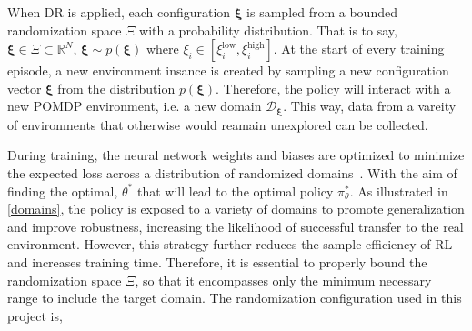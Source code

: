 \noindent When \ac{DR} is applied, each configuration $\boldsymbol{\xi}$ is sampled from a bounded randomization space $\Xi$ with a probability distribution. 
That is to say, $\boldsymbol{\xi} \in \Xi \subset \mathbb{R}^N$,  $\boldsymbol{\xi} \sim p(\boldsymbol{\xi})$ where $\xi_i \in [\xi_i^{\text{low}}, \xi_i^{\text{high}}]$. 
At the start of every training episode, a new environment insance is created by sampling a new configuration vector $\boldsymbol{\xi}$ from the distribution $p(\boldsymbol{\xi})$. 
Therefore, the policy will interact with a new \ac{POMDP} environment, i.e. a new domain $\mathcal{D}_{\boldsymbol{\xi}}$. 
This way, data from a vareity of environments that otherwise would reamain unexplored can be collected. 

During training, the neural network weights and biases are optimized to minimize the expected loss across a distribution of randomized domains~\cite{weng2019DR}.
With the aim of finding the optimal, $\theta^*$ that will lead to the optimal policy $\pi_{\theta}^*$.
As illustrated in \autoref{domains}, the policy is exposed to a variety of domains to promote generalization and improve robustness, increasing the likelihood of successful transfer to the real environment. 
However, this strategy further reduces the sample efficiency of \ac{RL} and increases training time. 
Therefore, it is essential to properly bound the randomization space $\Xi$, so that it encompasses only the minimum necessary range to include the target domain.
The randomization configuration used in this project is,




